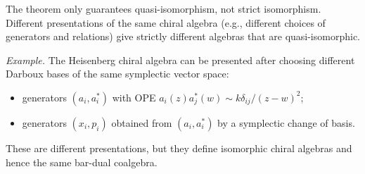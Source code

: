 \begin{remark}\label{rem:non-uniqueness-strict}
The theorem only guarantees quasi-isomorphism, not strict isomorphism. Different
presentations of the same chiral algebra (e.g., different choices of generators
and relations) give strictly different algebras that are quasi-isomorphic.

\emph{Example.} The Heisenberg chiral algebra can be presented after
choosing different Darboux bases of the same symplectic vector space:
\begin{itemize}
\item generators $(a_i,a_i^*)$ with OPE
$a_i(z)a_j^*(w)\sim k\delta_{ij}/(z-w)^2$;
\item generators $(x_i,p_i)$ obtained from $(a_i,a_i^*)$ by a
symplectic change of basis.
\end{itemize}

These are different presentations, but they define isomorphic chiral
algebras and hence the same bar-dual coalgebra.
\end{remark}
